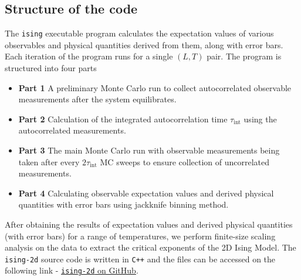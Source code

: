 \documentclass[../journal_main.tex]{subfiles}
\begin{document}
\subsection{Structure of the code}
The \texttt{ising} executable program calculates the expectation values of various observables and physical quantities derived from them, along with error bars. Each iteration of the program runs for a single $(L, T)$ pair. The program is structured into four parts
\begin{itemize}[label={}]
    \item \textbf{Part 1} \:\:\: A preliminary Monte Carlo run to collect autocorrelated observable measurements after the system equilibrates.
    \item \textbf{Part 2} \:\:\: Calculation of the integrated autocorrelation time $\tau_\text{int}$ using the autocorrelated measurements. 
    \item \textbf{Part 3} \:\:\: The main Monte Carlo run with observable measurements being taken after every $2\tau_\text{int}$ MC sweeps to ensure collection of uncorrelated measurements.
    \item \textbf{Part 4} \:\:\: Calculating observable expectation values and derived physical quantities with error bars using jackknife binning method.  
\end{itemize} 
After obtaining the results of expectation values and derived physical quantities (with error bars) for a range of temperatures, we perform finite-size scaling analysis on the data to extract the critical exponents of the 2D Ising Model. The \texttt{ising-2d} source code is written in \texttt{C++} and the files can be accessed on the following link - \href{https://github.com/kunal1729verma/ising-2d}{\texttt{ising-2d} on GitHub}.
\end{document}

